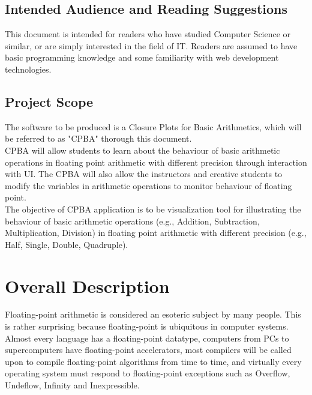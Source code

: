 \documentclass[11pt]{article}
\begin{document}
\subsection{Intended Audience and Reading Suggestions}
This document is intended for readers who have studied Computer Science or similar, or are simply interested in the field of IT. Readers are assumed to have basic programming knowledge and some familiarity with web development technologies.

\subsection{Project Scope}
The software to be produced is a Closure Plots for Basic Arithmetics, which will be referred to as "CPBA" thorough this document.\\

CPBA will allow students to learn about the behaviour of basic arithmetic operations in floating point arithmetic with different precision through interaction with UI. The CPBA will also allow the instructors and creative students to modify the variables in arithmetic operations to monitor behaviour of floating point.\\

The objective of CPBA application is to be visualization tool for illustrating the behaviour of basic arithmetic operations (e.g., Addition, Subtraction, Multiplication, Division) in floating point arithmetic with different precision (e.g., Half, Single, Double, Quadruple).\\





\section{Overall Description}%
Floating-point arithmetic is considered an esoteric subject by many people. This is rather surprising because floating-point is ubiquitous in computer systems. Almost every language has a floating-point datatype, computers from PCs to supercomputers have floating-point accelerators, most compilers will be called upon to compile floating-point algorithms from time to time, and virtually every operating system must respond to floating-point exceptions such as Overflow, Undeflow, Infinity and Inexpressible.\\
\end{document}
